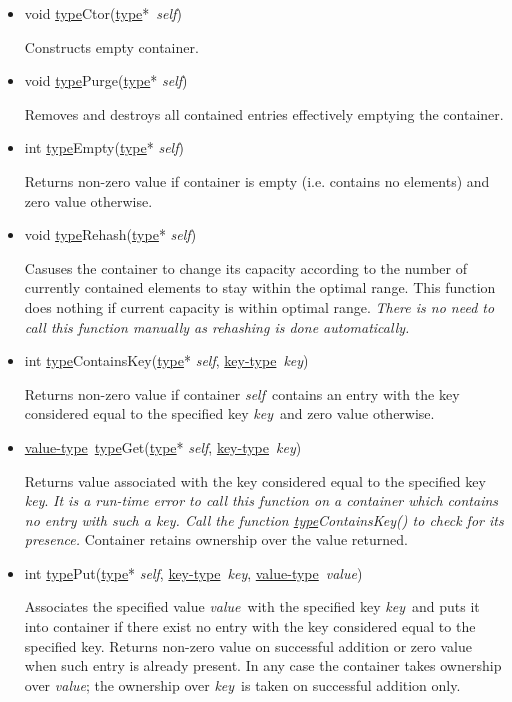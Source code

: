 \documentclass[a4paper]{article}
\newcommand{\st}{\underline{type}}
\newcommand{\kt}{\underline{key-type}}
\newcommand{\vt}{\underline{value-type}}
\newcommand{\sv}{\emph{self}}
\newcommand{\kv}{\emph{key}}
\newcommand{\vv}{\emph{value}}
\newcommand{\meth}[1]{#1}
\begin{document}
\begin{itemize}


\item \meth{void \st Ctor(\st*\ \sv)}


Constructs empty container.


\commonmethods


\item \meth{void \st Purge}(\st* \sv)


Removes and destroys all contained entries effectively emptying the container.


\item \meth{int \st Empty}(\st* \sv)


Returns non-zero value if container is empty (i.e. contains no elements) and zero value otherwise.


\item \meth{void \st Rehash(\st* \sv)}


Casuses the container to change its capacity according to the number of currently contained elements to stay within the optimal range.
This function does nothing if current capacity is within optimal range.
\emph{There is no need to call this function manually as rehashing is done automatically.}


\item \meth{int \st ContainsKey(\st* \sv, \kt\ \kv)}


Returns non-zero value if container \sv\ contains an entry with the key considered equal to the specified key \kv\ and zero value otherwise.


\item \meth{\vt\ \st Get(\st* \sv, \kt\ \kv)}


Returns value associated with the key considered equal to the specified key \kv.
\emph{It is a run-time error to call this function on a container which contains no entry with such a key. Call the function \meth{\st ContainsKey()} to check for its presence.}
Container retains ownership over the value returned.


\item \meth{int \st Put(\st* \sv, \kt\ \kv, \vt\ \vv)}


Associates the specified value \vv\ with the specified key \kv\ and puts it into container if there exist no entry with the key considered equal to the specified key.
Returns non-zero value on successful addition or zero value when such entry is already present.
In any case the container takes ownership over \vv; the ownership over \kv\ is taken on successful addition only.



\end{itemize}
\end{document}
